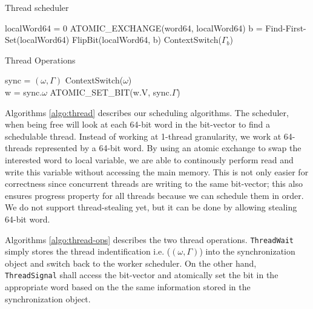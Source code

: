 \documentclass[11pt]{article}
\begin{document}
\begin{algorithm}
  \caption{Thread scheduler}
  \label{algo:thread}
  \begin{algorithmic}[1]
     
     
        \State localWord64 = 0
        \State ATOMIC_EXCHANGE(word64, localWord64)
          \State b = Find-First-Set(localWord64)
          \State FlipBit(localWord64, b)
          \State ContextSwitch($\Gamma_{b}$)
        \EndWhile
      \EndIf
      \EndFor
    \EndWhile
    \EndProcedure
  \end{algorithmic}
\end{algorithm}

\begin{algorithm}
  \caption{Thread Operations}
  \label{algo:thread-ops}
  \begin{algorithmic}[1]
      
      \State sync = {$(\omega, \Gamma)$}
      \State ContextSwitch($\omega$)
    \EndProcedure
    \\ 
     
      \State w = sync.$\omega$
      \State ATOMIC_SET_BIT(w.V, sync.$\Gamma$)
    \EndProcedure
  \end{algorithmic}
\end{algorithm}

Algorithms \ref{algo:thread} describes our scheduling algorithms. The
scheduler, when being free will look at each 64-bit word in the bit-vector to
find a schedulable thread.  Instead of working at 1-thread granularity, we work
at 64-threads represented by a 64-bit word. By using an atomic exchange to swap
the interested word to local variable, we are able to continously perform read
and write this variable without accessing the main memory.  This is not only
easier for correctness since concurrent threads are writing to the same
bit-vector; this also ensures progress property for all threads because we
can schedule them in order. We do not support thread-stealing yet, but it can
be done by allowing stealing 64-bit word.

Algorithms \ref{algo:thread-ops} describes the two thread operations.
\texttt{ThreadWait} simply stores the thread indentification i.e. ($(\omega,
\Gamma)$) into the synchronization object and switch back to the worker
scheduler. On the other hand, \texttt{ThreadSignal} shall access the
bit-vector and atomically set the bit in the appropriate word based on the
the same information stored in the synchronization object.
\end{document}
